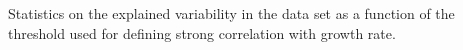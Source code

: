 
  Statistics on the explained variability in the data set as a function of the threshold used for defining strong correlation with growth rate.
